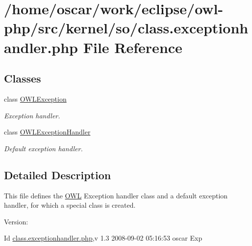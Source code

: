 \hypertarget{class_8exceptionhandler_8php}{
\section{/home/oscar/work/eclipse/owl-php/src/kernel/so/class.exceptionhandler.php File Reference}
\label{class_8exceptionhandler_8php}
}
\subsection*{Classes}
\begin{CompactItemize}
\item 
class \hyperlink{classOWLException}{OWLException}
\begin{CompactList}\small\item\em Exception handler. \item\end{CompactList}\item 
class \hyperlink{classOWLExceptionHandler}{OWLExceptionHandler}
\begin{CompactList}\small\item\em Default exception handler. \item\end{CompactList}\end{CompactItemize}


\subsection{Detailed Description}
This file defines the \hyperlink{classOWL}{OWL} Exception handler class and a default exception handler, for which a special class is created. \begin{Desc}
\item[Version:]\end{Desc}
\begin{Desc}
\item[Id]\hyperlink{class_8exceptionhandler_8php}{class.exceptionhandler.php},v 1.3 2008-09-02 05:16:53 oscar Exp \end{Desc}
